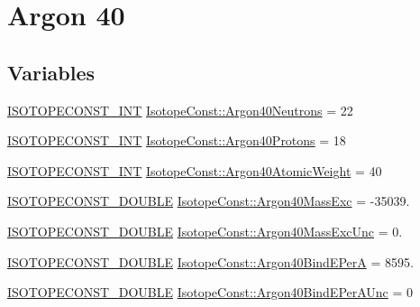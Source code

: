\hypertarget{group___isotope_const-_argon-_ar40}{}\section{Argon 40}
\label{group___isotope_const-_argon-_ar40}
\subsection*{Variables}
\begin{DoxyCompactItemize}
\item 
\mbox{\hyperlink{group___isotope_const-_macros_ga5f18360b3e99483a35c32d789e62621c}{I\+S\+O\+T\+O\+P\+E\+C\+O\+N\+S\+T\+\_\+\+I\+NT}} \mbox{\hyperlink{group___isotope_const-_argon-_ar40_gacb4850c20ea033f43fb2d509897ffb98}{Isotope\+Const\+::\+Argon40\+Neutrons}} = 22
\item 
\mbox{\hyperlink{group___isotope_const-_macros_ga5f18360b3e99483a35c32d789e62621c}{I\+S\+O\+T\+O\+P\+E\+C\+O\+N\+S\+T\+\_\+\+I\+NT}} \mbox{\hyperlink{group___isotope_const-_argon-_ar40_ga27beff1de1ae0c53eb6733bb7d253f40}{Isotope\+Const\+::\+Argon40\+Protons}} = 18
\item 
\mbox{\hyperlink{group___isotope_const-_macros_ga5f18360b3e99483a35c32d789e62621c}{I\+S\+O\+T\+O\+P\+E\+C\+O\+N\+S\+T\+\_\+\+I\+NT}} \mbox{\hyperlink{group___isotope_const-_argon-_ar40_ga756718f3086c996b8d304abd09b94c1a}{Isotope\+Const\+::\+Argon40\+Atomic\+Weight}} = 40
\item 
\mbox{\hyperlink{group___isotope_const-_macros_ga8f45a7272ce02c0b4c65c44636ed719a}{I\+S\+O\+T\+O\+P\+E\+C\+O\+N\+S\+T\+\_\+\+D\+O\+U\+B\+LE}} \mbox{\hyperlink{group___isotope_const-_argon-_ar40_ga6c2641fd396df3e95e37e1ad6f6f9f88}{Isotope\+Const\+::\+Argon40\+Mass\+Exc}} = -\/35039.
\item 
\mbox{\hyperlink{group___isotope_const-_macros_ga8f45a7272ce02c0b4c65c44636ed719a}{I\+S\+O\+T\+O\+P\+E\+C\+O\+N\+S\+T\+\_\+\+D\+O\+U\+B\+LE}} \mbox{\hyperlink{group___isotope_const-_argon-_ar40_gaa589e1ce4822f3869240aba294385162}{Isotope\+Const\+::\+Argon40\+Mass\+Exc\+Unc}} = 0.
\item 
\mbox{\hyperlink{group___isotope_const-_macros_ga8f45a7272ce02c0b4c65c44636ed719a}{I\+S\+O\+T\+O\+P\+E\+C\+O\+N\+S\+T\+\_\+\+D\+O\+U\+B\+LE}} \mbox{\hyperlink{group___isotope_const-_argon-_ar40_ga6fec049790b58dad626c0cb5ead2e817}{Isotope\+Const\+::\+Argon40\+Bind\+E\+PerA}} = 8595.
\item 
\mbox{\hyperlink{group___isotope_const-_macros_ga8f45a7272ce02c0b4c65c44636ed719a}{I\+S\+O\+T\+O\+P\+E\+C\+O\+N\+S\+T\+\_\+\+D\+O\+U\+B\+LE}} \mbox{\hyperlink{group___isotope_const-_argon-_ar40_ga9b212a71643c16fc780de85ba5ddd0ac}{Isotope\+Const\+::\+Argon40\+Bind\+E\+Per\+A\+Unc}} = 0

\end{DoxyCompactItemize}
